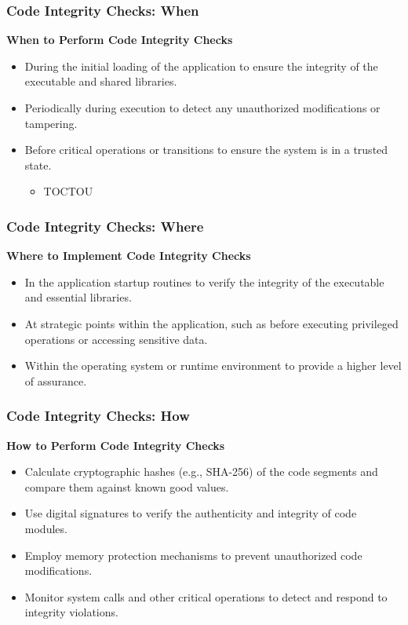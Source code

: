 \begin{frame}
    \frametitle{Code Integrity Checks: When}
    \textbf{When to Perform Code Integrity Checks}
    \begin{itemize}
        \item During the initial loading of the application to ensure the integrity of the executable and shared libraries.
        \item Periodically during execution to detect any unauthorized modifications or tampering.
        \item Before critical operations or transitions to ensure the system is in a trusted state.
        \begin{itemize}
            \item TOCTOU
        \end{itemize}
    \end{itemize}
\end{frame}

\begin{frame}
    \frametitle{Code Integrity Checks: Where}
    \textbf{Where to Implement Code Integrity Checks}
    \begin{itemize}
        \item In the application startup routines to verify the integrity of the executable and essential libraries.
        \item At strategic points within the application, such as before executing privileged operations or accessing sensitive data.
        \item Within the operating system or runtime environment to provide a higher level of assurance.
    \end{itemize}
\end{frame}

\begin{frame}
    \frametitle{Code Integrity Checks: How}
    \textbf{How to Perform Code Integrity Checks}
    \begin{itemize}
        \item Calculate cryptographic hashes (e.g., SHA-256) of the code segments and compare them against known good values.
        \item Use digital signatures to verify the authenticity and integrity of code modules.
        \item Employ memory protection mechanisms to prevent unauthorized code modifications.
        \item Monitor system calls and other critical operations to detect and respond to integrity violations.
    \end{itemize}
\end{frame}

